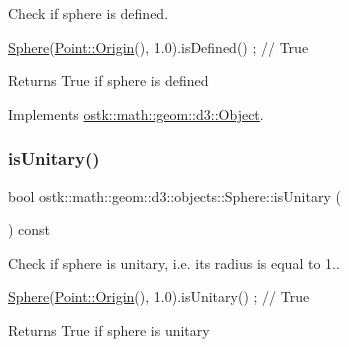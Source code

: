 Check if sphere is defined. 


\begin{DoxyCode}
\hyperlink{classostk_1_1math_1_1geom_1_1d3_1_1objects_1_1_sphere_a6920f72260a7b2c9ffc29283540e16c2}{Sphere}(\hyperlink{classostk_1_1math_1_1geom_1_1d3_1_1objects_1_1_point_a079c199f08b015d456d02728a71b534c}{Point::Origin}(), 1.0).isDefined() ; \textcolor{comment}{// True}
\end{DoxyCode}


\begin{DoxyReturn}{Returns}
True if sphere is defined 
\end{DoxyReturn}


Implements \hyperlink{classostk_1_1math_1_1geom_1_1d3_1_1_object_a271a1964cd208be85ce9a0a429395ad8}{ostk\+::math\+::geom\+::d3\+::\+Object}.

\mbox{\label{classostk_1_1math_1_1geom_1_1d3_1_1objects_1_1_sphere_a9e1c2a66a1d61d461e0e02d5a6cce709}} 
\subsubsection{\texorpdfstring{is\+Unitary()}{isUnitary()}}
{\footnotesize\ttfamily bool ostk\+::math\+::geom\+::d3\+::objects\+::\+Sphere\+::is\+Unitary (\begin{DoxyParamCaption}{ }\end{DoxyParamCaption}) const}



Check if sphere is unitary, i.\+e. its radius is equal to 1.. 


\begin{DoxyCode}
\hyperlink{classostk_1_1math_1_1geom_1_1d3_1_1objects_1_1_sphere_a6920f72260a7b2c9ffc29283540e16c2}{Sphere}(\hyperlink{classostk_1_1math_1_1geom_1_1d3_1_1objects_1_1_point_a079c199f08b015d456d02728a71b534c}{Point::Origin}(), 1.0).isUnitary() ; \textcolor{comment}{// True}
\end{DoxyCode}


\begin{DoxyReturn}{Returns}
True if sphere is unitary 
\end{DoxyReturn}
\mbox{\label{classostk_1_1math_1_1geom_1_1d3_1_1objects_1_1_sphere_ae72e72141c1c4526bfa86161ffb15a37}} 
